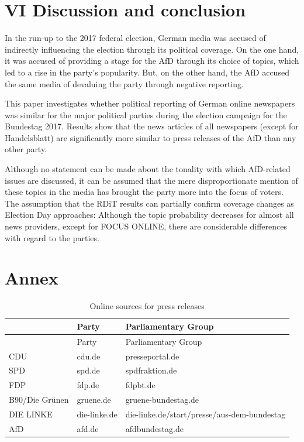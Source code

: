 \documentclass[
  12pt,
]{article}
\begin{document}
\hypertarget{vi-discussion-and-conclusion}{%
\section{VI Discussion and
conclusion}\label{vi-discussion-and-conclusion}}

In the run-up to the 2017 federal election, German media was accused of
indirectly influencing the election through its political coverage. On
the one hand, it was accused of providing a stage for the AfD through
its choice of topics, which led to a rise in the party's popularity.
But, on the other hand, the AfD accused the same media of devaluing the
party through negative reporting.

This paper investigates whether political reporting of German online
newspapers was similar for the major political parties during the
election campaign for the Bundestag 2017. Results show that the news
articles of all newspapers (except for Handelsblatt) are significantly
more similar to press releases of the AfD than any other party.

Although no statement can be made about the tonality with which
AfD-related issues are discussed, it can be assumed that the mere
disproportionate mention of these topics in the media has brought the
party more into the focus of voters. The assumption that the RDiT
results can partially confirm coverage changes as Election Day
approaches: Although the topic probability decreases for almost all news
providers, except for FOCUS ONLINE, there are considerable differences
with regard to the parties.

\newpage

\hypertarget{annex}{%
\section{Annex}\label{annex}}

\begin{longtable}[]{@{}lll@{}}
\caption{Online sources for press releases
\label{table:press_releases_sources}}\tabularnewline
\toprule
& Party & Parliamentary Group \\
\midrule
\endfirsthead
\toprule
& Party & Parliamentary Group \\
\midrule
\endhead
CDU & cdu.de & presseportal.de \\
SPD & spd.de & spdfraktion.de \\
FDP & fdp.de & fdpbt.de \\
B90/Die Grünen & gruene.de & gruene-bundestag.de \\
DIE LINKE & die-linke.de &
die-linke.de/start/presse/aus-dem-bundestag \\
AfD & afd.de & afdbundestag.de \\
\bottomrule
\end{longtable}
\end{document}
